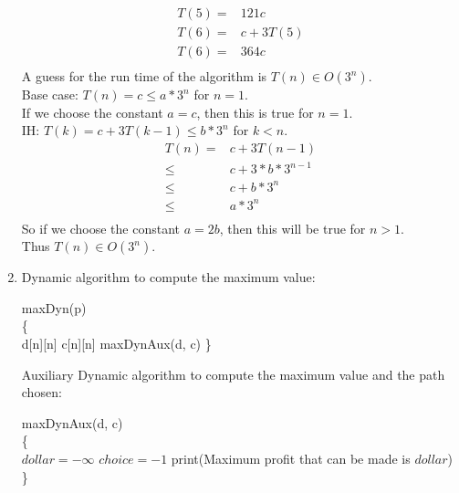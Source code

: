 \documentclass{assignment}
\begin{document}
\begin{problemlist}
\begin{answer}
\begin{enumerate}
\begin{align*}
T(5) = &121c\\
T(6) = &c + 3T(5)\\
T(6) = &364c\\
\end{align*}
A guess for the run time of the algorithm is $T(n) \in O(3^n)$.\\
Base case: $T(n) = c \le a*3^n$ for $n = 1$.\\
If we choose the constant $a=c$, then this is true for $n = 1$.\\
IH: $T(k) = c + 3T(k-1) \le b*3^n$ for $k<n$.\\
\begin{align*}
T(n) = &c + 3T(n-1)\\
\le &c + 3*b*3^{n-1}\\
\le &c + b*3^n\\
\le &a*3^n\\ 
\end{align*}
So if we choose the constant $a=2b$, then this will be true for $n>1$.\\
Thus $T(n) \in O(3^n)$.\\
\clearpage
\item
Dynamic algorithm to compute the maximum value:
\IncMargin{3em}
\begin{algorithm}
  maxDyn(p)\\\{\\
  \Indp
  d[n][n]\; c[n][n]\;
  maxDynAux(d, c)\;
  \Indm
  \}
\end{algorithm}
\DecMargin{3em}
\clearpage
Auxiliary Dynamic algorithm to compute the maximum value and the path chosen:
\IncMargin{3em}
\begin{algorithm}
  maxDynAux(d, c)\\\{\\
  \Indp
  $dollar=-\infty$\;
  $choice=-1$\;
  print(Maximum profit that can be made is $dollar$)\;
  \Indm
  \}
\end{algorithm}

\end{enumerate}
\end{answer}
\end{problemlist}
\end{document}
